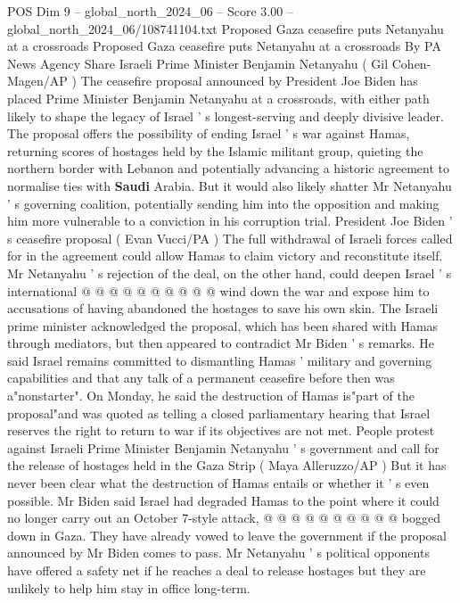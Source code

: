 \begin{textsample}{POS Dim 9 – global\_north\_2024\_06 – Score 3.00 – global\_north\_2024\_06/108741104.txt}  \label{ex:f9_pos_275}
Proposed Gaza ceasefire puts Netanyahu at a crossroads Proposed Gaza ceasefire puts Netanyahu at a crossroads By PA News Agency Share Israeli Prime Minister Benjamin Netanyahu ( Gil Cohen-Magen/AP ) The ceasefire proposal announced by President Joe Biden has placed Prime Minister Benjamin Netanyahu at a crossroads, with either path likely to shape the legacy of Israel ' s longest-serving and deeply divisive leader.
The proposal offers the possibility of ending Israel ' s war against Hamas, returning scores of hostages held by the Islamic militant group, quieting the northern border with Lebanon and potentially advancing a historic agreement to normalise ties with \textbf{Saudi} Arabia.
But it would also likely shatter Mr Netanyahu ' s governing coalition, potentially sending him into the opposition and making him more vulnerable to a conviction in his corruption trial.
President Joe Biden ' s ceasefire proposal ( Evan Vucci/PA ) The full withdrawal of Israeli forces called for in the agreement could allow Hamas to claim victory and reconstitute itself.
Mr Netanyahu ' s rejection of the deal, on the other hand, could deepen Israel ' s international @ @ @ @ @ @ @ @ @ @ wind down the war and expose him to accusations of having abandoned the hostages to save his own skin.
The Israeli prime minister acknowledged the proposal, which has been shared with Hamas through mediators, but then appeared to contradict Mr Biden ' s remarks.
He said Israel remains committed to dismantling Hamas ' military and governing capabilities and that any talk of a permanent ceasefire before then was a"nonstarter".
On Monday, he said the destruction of Hamas is"part of the proposal"and was quoted as telling a closed parliamentary hearing that Israel reserves the right to return to war if its objectives are not met.
People protest against Israeli Prime Minister Benjamin Netanyahu ' s government and call for the release of hostages held in the Gaza Strip ( Maya Alleruzzo/AP ) But it has never been clear what the destruction of Hamas entails or whether it ' s even possible.
Mr Biden said Israel had degraded Hamas to the point where it could no longer carry out an October 7-style attack, @ @ @ @ @ @ @ @ @ @ bogged down in Gaza.
They have already vowed to leave the government if the proposal announced by Mr Biden comes to pass.
Mr Netanyahu ' s political opponents have offered a safety net if he reaches a deal to release hostages but they are unlikely to help him stay in office long-term.

\end{textsample}
